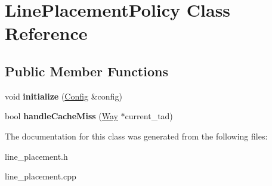 \hypertarget{classLinePlacementPolicy}{\section{Line\-Placement\-Policy Class Reference}
\label{classLinePlacementPolicy}
}
\subsection*{Public Member Functions}
\begin{DoxyCompactItemize}
\item 
\hypertarget{classLinePlacementPolicy_a1126cfedae959b5731be05b098db344a}{void {\bfseries initialize} (\hyperlink{classConfig}{Config} \&config)}\label{classLinePlacementPolicy_a1126cfedae959b5731be05b098db344a}

\item 
\hypertarget{classLinePlacementPolicy_a13d6dad984a1bcebde7a771b6997024e}{bool {\bfseries handle\-Cache\-Miss} (\hyperlink{classWay}{Way} $\ast$current\-\_\-tad)}\label{classLinePlacementPolicy_a13d6dad984a1bcebde7a771b6997024e}

\end{DoxyCompactItemize}


The documentation for this class was generated from the following files\-:\begin{DoxyCompactItemize}
\item 
line\-\_\-placement.\-h\item 
line\-\_\-placement.\-cpp\end{DoxyCompactItemize}
